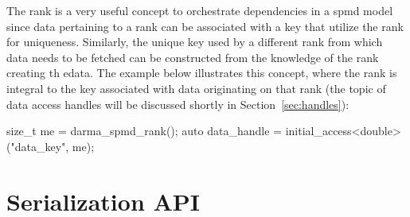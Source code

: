 The rank is a very useful concept to orchestrate dependencies in a \gls{spmd}
model since data pertaining to a rank can be associated with a key that utilize
the rank for uniqueness. Similarly, the unique key used by a different rank
from which data needs to be fetched can be constructed from the knowledge of
the rank creating th edata.  The example below illustrates this concept, where
the rank is integral to the key associated with data originating on that rank
(the topic of data access handles will be discussed shortly in Section~\ref{sec:handles}):
\begin{CppCode}
size_t me = darma_spmd_rank();
auto data_handle = initial_access<double>("data_key", me);
\end{CppCode}  



\section{Serialization API}
